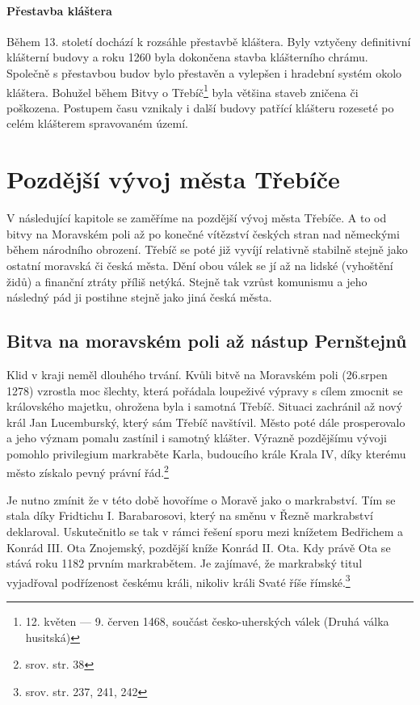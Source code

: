 \documentclass[a4paper,oneside,12pt]{report}
\begin{document}
\subsubsection{Přestavba kláštera}

Během 13. století dochází k rozsáhle přestavbě kláštera.
Byly vztyčeny definitivní klášterní budovy a roku 1260 byla dokončena stavba klášterního chrámu.
Společně s přestavbou budov bylo přestavěn a vylepšen i hradební systém okolo kláštera.
Bohužel během Bitvy o Třebíč\footnote{12. květen — 9. červen 1468, součást česko-uherských válek (Druhá válka husitská)} byla většina staveb zničena či poškozena.
Postupem času vznikaly i další budovy patřící klášteru rozeseté po celém klášterem spravovaném území.

\chapter{Pozdější vývoj města Třebíče}

V následující kapitole se zaměříme na pozdější vývoj města Třebíče.
A to od bitvy na Moravském poli až po konečné vítězství českých stran nad německými během národního obrození.
Třebíč se poté již vyvíjí relativně stabilně stejně jako ostatní moravská či česká města.
Dění obou válek se jí až na lidské (vyhoštění židů) a finanční ztráty příliš netýká.
Stejně tak vzrůst komunismu a jeho následný pád ji postihne stejně jako jiná česká města.

\section{Bitva na moravském poli až nástup Pernštejnů}

Klid v kraji neměl dlouhého trvání.
Kvůli bitvě na Moravském poli (26.srpen 1278) vzrostla moc šlechty, která pořádala loupeživé výpravy s cílem zmocnit se královského majetku, ohrožena byla i samotná Třebíč.
Situaci zachránil až nový král Jan Lucemburský, který sám Třebíč navštívil.
Město poté dále prosperovalo a jeho význam pomalu zastínil i samotný klášter.
Výrazně pozdějšímu vývoji pomohlo privilegium markraběte Karla, budoucího krále Krala IV, díky kterému město získalo pevný právní řád.\footnote{srov. \cite{Uhlir1978} str. 38}

Je nutno zmínit že v této době hovoříme o Moravě jako o markrabství.
Tím se stala díky Fridtichu I. Barabarosovi, který na směnu v Řezně markrabství deklaroval.
Uskutečnitlo se tak v rámci řešení sporu mezi knížetem Bedřichem a Konrád III. Ota Znojemský, pozdější kníže Konrád II. Ota.
Kdy právě Ota se stává roku 1182 prvním markrabětem.
Je zajímavé, že markrabský titul vyjadřoval podřízenost českému králi, nikoliv králi Svaté říše římské.\footnote{srov.  str. 237, 241, 242}
\end{document}
